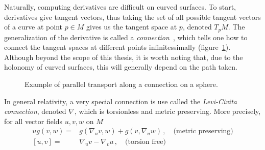 Naturally, computing derivatives are difficult on curved surfaces. To start, derivatives give tangent vectors, thus taking the set of all possible tangent vectors of a curve at point $p\in M$ gives us the tangent space at $p$, denoted $T_pM$. The generalization of the derivative is called a \textit{connection}~\cite{baez_john_gauge_1994}, which tells one how to connect the tangent spaces at different points infinitessimally (figure~\ref{fig:parallel_transport}). Although beyond the scope of this thesis, it is worth noting that, due to the holonomy of curved surfaces, this will generally depend on the path taken.
\begin{figure}
    \centering
    \caption{Example of parallel transport along a connection on a sphere. }
    \label{fig:parallel_transport}
\end{figure}
In general relativity, a very special connection is use called the \textit{Levi-Civita connection}, denoted $\nabla$, which is torsionless and metric preserving. More precisely, for all vector fields $u,v,w$ on $M$
\begin{equation}
    \begin{split}
        u g(v,w) =& g(\nabla_u v, w)+g(v,\nabla_uw) \,,\quad \text{(metric preserving)} \\
        [u,v] =& \nabla_u v - \nabla_v u \,,\quad \text{(torsion free)}
    \end{split}
\end{equation}

